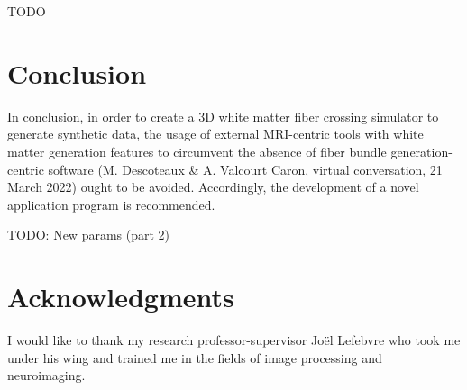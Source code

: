\documentclass{article}
\begin{document}
  TODO


  \section{Conclusion}\label{sec:conclusion}

  In conclusion, in order to create a 3D white matter fiber crossing simulator to generate synthetic data, the usage of external MRI-centric tools with white matter generation features to circumvent the absence of fiber bundle generation-centric software (M. Descoteaux \& A. Valcourt Caron, virtual conversation, 21 March 2022) ought to be avoided.
  Accordingly, the development of a novel application program is recommended.

  TODO: New params (part 2)

  \section*{Acknowledgments}\label{sec:thanks}

  I would like to thank my research professor-supervisor Joël Lefebvre who took me under his wing and trained me in the fields of image processing and neuroimaging.


  
  
\end{document}
